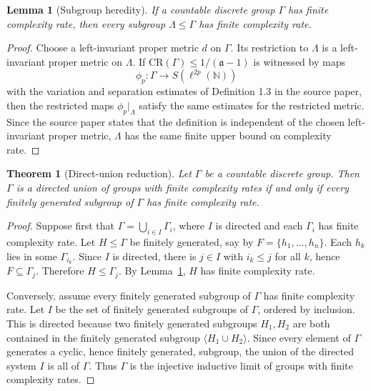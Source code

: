 \documentclass[11pt]{article}
\newtheorem{theorem}{Theorem}
\newtheorem{lemma}{Lemma}
\begin{document}
\begin{lemma}[Subgroup heredity]\label{lem:heredity}
If a countable discrete group $\Gamma$ has finite complexity rate, then every subgroup $\Lambda\leq \Gamma$ has finite complexity rate.
\end{lemma}

\begin{proof}
Choose a left-invariant proper metric $d$ on $\Gamma$. Its restriction to $\Lambda$ is a left-invariant proper metric on $\Lambda$. If $\mathrm{CR}(\Gamma)\leq 1/(\mathfrak a-1)$ is witnessed by maps
\[
  \phi_p:\Gamma\to S(\ell^{2p}(\mathbb N))
\]
with the variation and separation estimates of Definition 1.3 in the source paper, then the restricted maps $\phi_p|_\Lambda$ satisfy the same estimates for the restricted metric. Since the source paper states that the definition is independent of the chosen left-invariant proper metric, $\Lambda$ has the same finite upper bound on complexity rate.
\end{proof}

\begin{theorem}[Direct-union reduction]\label{thm:reduction}
Let $\Gamma$ be a countable discrete group. Then $\Gamma$ is a directed union of groups with finite complexity rates if and only if every finitely generated subgroup of $\Gamma$ has finite complexity rate.
\end{theorem}

\begin{proof}
Suppose first that $\Gamma=\bigcup_{i\in I}\Gamma_i$, where $I$ is directed and each $\Gamma_i$ has finite complexity rate. Let $H\leq \Gamma$ be finitely generated, say by $F=\{h_1,\ldots,h_n\}$. Each $h_k$ lies in some $\Gamma_{i_k}$. Since $I$ is directed, there is $j\in I$ with $i_k\leq j$ for all $k$, hence $F\subseteq \Gamma_j$. Therefore $H\leq \Gamma_j$. By Lemma~\ref{lem:heredity}, $H$ has finite complexity rate.

Conversely, assume every finitely generated subgroup of $\Gamma$ has finite complexity rate. Let $I$ be the set of finitely generated subgroups of $\Gamma$, ordered by inclusion. This is directed because two finitely generated subgroups $H_1,H_2$ are both contained in the finitely generated subgroup $\langle H_1\cup H_2\rangle$. Since every element of $\Gamma$ generates a cyclic, hence finitely generated, subgroup, the union of the directed system $I$ is all of $\Gamma$. Thus $\Gamma$ is the injective inductive limit of groups with finite complexity rates.
\end{proof}
\end{document}
